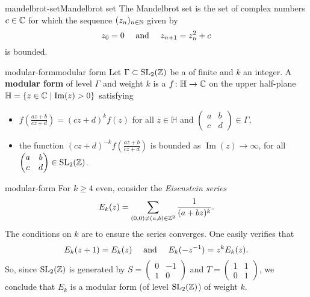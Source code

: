 \begin{topic}{mandelbrot-set}{Mandelbrot set}
    The Mandelbrot set is the set of complex numbers $c \in \mathbb{C}$ for which the sequence $(z_n)_{n \in \mathbb{N}}$ given by
    \[ z_0 = 0 \quad \textup{ and } \quad z_{n + 1} = z_n^2 + c \]
    is bounded.
\end{topic}

\begin{topic}{modular-form}{modular form}
    Let $\Gamma \subset \textup{SL}_2(\mathbb{Z})$ be a  of finite  and $k$ an integer.  A \textbf{modular form} of level $\Gamma$ and weight $k$ is a  $f \colon \mathbb{H} \to \mathbb{C}$ on the upper half-plane $\mathbb{H} = \{ z \in \mathbb{C} \mid \operatorname{Im}(z) > 0 \}$ satisfying
    \begin{itemize}
        \item $f\left(\frac{az + b}{cz + d}\right) = (cz + d)^k f(z)$ for all $z \in \mathbb{H}$ and $\begin{pmatrix} a & b \\ c & d \end{pmatrix} \in \Gamma$,
        \item the function $(cz + d)^{-k} f\left(\frac{az + b}{cz + d}\right)$ is bounded as $\operatorname{Im}(z) \to \infty$, for all $\begin{pmatrix} a & b \\ c & d \end{pmatrix} \in \textup{SL}_2(\mathbb{Z})$.
    \end{itemize}
\end{topic}

\begin{example}{modular-form}
    For $k \ge 4$ even, consider the \textit{Eisenstein series}
    \[ E_k(z) = \sum_{(0, 0) \ne (a, b) \in \mathbb{Z}^2} \frac{1}{(a + bz)^k} . \]
    The conditions on $k$ are to ensure the series converges. One easily verifies that
    \[ E_k(z + 1) = E_k(z) \quad \textup{ and } \quad E_k(- z^{-1}) = z^k E_k(z) . \]
    So, since $\textup{SL}_2(\mathbb{Z})$ is generated by $S = \begin{pmatrix} 0 & -1 \\ 1 & 0 \end{pmatrix}$ and $T = \begin{pmatrix} 1 & 1 \\ 0 & 1 \end{pmatrix}$, we conclude that $E_k$ is a modular form (of level $\textup{SL}_2(\mathbb{Z})$) of weight $k$.
\end{example}

